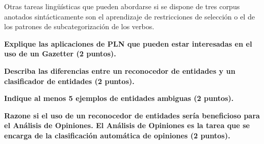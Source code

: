 \documentclass[11pt]{exam}
\begin{document}
\begin{questions}
Otras tareas lingüísticas que pueden abordarse si se dispone de tres corpus anotados sintácticamente son el aprendizaje de restricciones de selección o el de los patrones de subcategorización de los verbos.


{\bf \question Explique las aplicaciones de PLN que pueden estar interesadas en el uso de un Gazetter (2 puntos).}

{\bf \question Describa las diferencias entre un reconocedor de entidades y un clasificador de entidades (2 puntos).}

{\bf \question Indique al menos 5 ejemplos de entidades ambiguas (2 puntos).}

{\bf \question Razone si el uso de un reconocedor de entidades sería beneficioso para el Análisis de Opiniones. El Análisis de Opiniones es la tarea que se encarga de la clasificación automática de opiniones (2 puntos).}

\end{questions}
\end{document}
